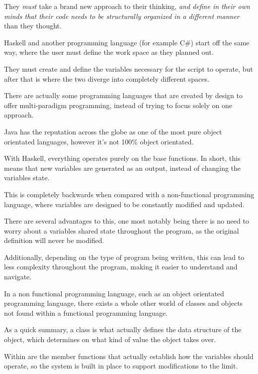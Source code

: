\documentclass{article}
\begin{document}
They \textit{must} take a brand new approach to their thinking, \textit{and define in their own minds that their code needs to be structurally organized in a different manner} than they thought.

\medskip\noindent
Haskell and another programming language (for example C\#) start off the same way, where the user must define the work space as they planned out. 

\medskip\noindent
They must create and define the variables necessary for the script to operate, but after that is where the two diverge into completely different spaces. 

\medskip\noindent
There are actually some programming languages that are created by design to offer multi-paradigm programming, instead of trying to focus solely on one approach\cite{IC}. 

\medskip\noindent
Java has the reputation across the globe as one of the most pure object orientated languages, however it's not 100\% object orientated.

\medskip\noindent
With Haskell, everything operates purely on the base functions. In short, this means that new variables are generated as an output, instead of changing the variables state. 

\medskip\noindent
This is completely backwards when compared with a non-functional programming language, where variables are designed to be constantly modified and updated.

\medskip\noindent
There are several advantages to this, one most notably being there is no need to worry about a variables shared state throughout the program, as the original definition will never be modified.  

\medskip\noindent
Additionally, depending on the type of program being written, this can lead to less complexity throughout the program, making it easier to understand and navigate.

\medskip\noindent
In a non functional programming language, such as an object orientated programming language, there exists a whole other world of classes and objects not found within a functional programming language. 

\medskip\noindent
As a quick summary, a class is what actually defines the data structure of the object, which determines on what kind of value the object takes over. 

\medskip\noindent
Within are the member functions that actually establish how the variables should operate, so the system is built in place to support modifications to the limit.
\end{document}
